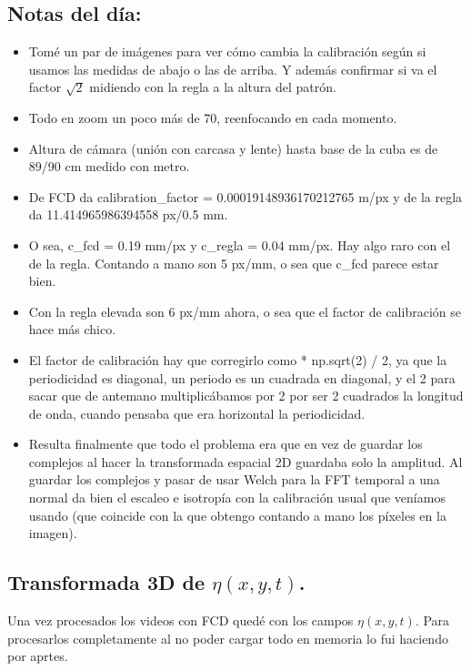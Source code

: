 \subsection*{Notas del día:} 
\begin{itemize}
	\setlength\itemsep{0.5421em}
	\item Tomé un par de imágenes para ver cómo cambia la calibración según si usamos las medidas de abajo o las de arriba. Y además confirmar si va el factor $\sqrt{2}$ midiendo con la regla a la altura del patrón. 
	\item  Todo en zoom un poco más de 70, reenfocando en cada momento. 
	\item  Altura de cámara (unión con carcasa y lente) hasta base de la cuba es de 89/90 cm medido con metro.  
	
	\item  De FCD da calibration\_factor = 0.00019148936170212765 m/px y de la regla da 11.414965986394558 px/0.5 mm. 
	\item O sea, c\_fcd = 0.19 mm/px y c\_regla = 0.04 mm/px. Hay algo raro con el de la regla. Contando a mano son 5 px/mm, o sea que c\_fcd parece estar bien.
	\item  Con la regla elevada son 6 px/mm ahora, o sea que el factor de calibración se hace más chico. 
	
	\item  El factor de calibración hay que corregirlo como * np.sqrt(2) / 2, ya que la periodicidad es diagonal, un periodo es un cuadrada en diagonal, y el 2 para sacar que de antemano multiplicábamos por 2 por ser 2 cuadrados la longitud de onda, cuando pensaba que era horizontal la periodicidad. 
	\item Resulta finalmente que todo el problema era que en vez de guardar los complejos al hacer la transformada espacial 2D guardaba solo la amplitud. Al guardar los complejos y pasar de usar Welch para la FFT temporal a una normal da bien el escaleo e isotropía con la calibración usual que veníamos usando (que coincide con la que obtengo contando a mano los píxeles en la imagen). 
\end{itemize}

\subsection*{Transformada 3D de $\eta(x, y, t)$.}
Una vez procesados los videos con FCD quedé con los campos $\eta(x, y, t)$. Para procesarlos completamente al no poder cargar todo en memoria lo fui haciendo por aprtes. 


